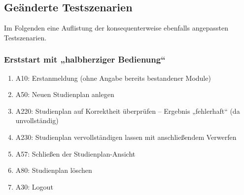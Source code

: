 \newenvironment{scenario}[1]{
	\vspace{-\baselineskip}
	\subsubsection*{#1} 
	\vspace{-\baselineskip}
	\begin{enumerate}[nosep]
}{
	\end{enumerate}
}

\newenvironment{scenario*}[2]{
	\vspace{-\baselineskip}
	\subsubsection*{#1} \vspace{-\baselineskip}
	\hspace{0pt}#2  \vspace{-\baselineskip}
	\begin{enumerate}[nosep]
}{
	\end{enumerate}
}


\FloatBarrier
\subsection{Geänderte Testszenarien}

Im Folgenden eine Auflistung der konsequenterweise ebenfalls angepassten Testszenarien.

\begin{scenario}{Erststart mit „halbherziger Bedienung“}
	\item A10: Erstanmeldung (ohne Angabe bereits bestandener {Module})
	\item A50: Neuen Studienplan anlegen
	\item A220: Studienplan auf Korrektheit überprüfen – Ergebnis „fehlerhaft“ (da unvollständig)
	\item A230: Studienplan vervollständigen lassen mit anschließendem Verwerfen
	\item A57: Schließen der Studienplan-Ansicht
	\item A80: Studienplan löschen 
	\item A30: Logout
\end{scenario}

